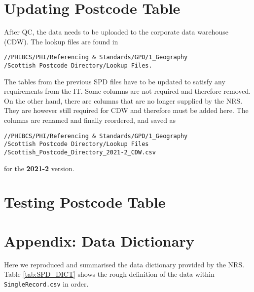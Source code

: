 \documentclass[12pt]{article}
\begin{document}
\section{Updating Postcode Table}
After QC, the data needs to be uploaded to the
corporate data warehouse (CDW). The lookup files are found in
\begin{lstlisting}
//PHIBCS/PHI/Referencing & Standards/GPD/1_Geography
/Scottish Postcode Directory/Lookup Files.
\end{lstlisting} 
The tables from
the previous SPD files have to be updated to satisfy
any requirements from the IT. Some columns
are not required and therefore removed. On the other hand,
there are columns that are no longer supplied by the NRS.
They are however still required for CDW and therefore
must be added here. The columns are renamed and finally
reordered, and saved as
\begin{lstlisting}
//PHIBCS/PHI/Referencing & Standards/GPD/1_Geography
/Scottish Postcode Directory/Lookup Files
/Scottish_Postcode_Directory_2021-2_CDW.csv
\end{lstlisting} 
for the \textbf{2021-2} version.

\section{Testing Postcode Table}


\appendix
\section{Appendix: Data Dictionary}\label{appendix:dict}
Here we reproduced and summarised the data dictionary provided by the NRS. Table {\ref{tab:SPD_DICT}} shows the rough definition of the data within \texttt{SingleRecord.csv}
in order.
\end{document}
